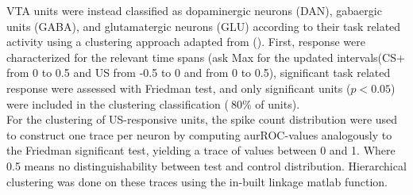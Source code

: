VTA units were instead classified as dopaminergic neurons (DAN), gabaergic units (GABA), and glutamatergic neurons (GLU) according to their task related activity using a clustering approach adapted from (\cite{Uchida}). First, response were characterized for the relevant time spans ({\color{red}ask Max for the updated intervals}(CS+ from 0 to 0.5 and US from -0.5 to 0 and from 0 to 0.5), significant task related response were assessed with Friedman test, and only significant units ($p<0.05$) were included in the clustering classification ($~80\%$ of units).\\For the clustering of US-responsive units, the spike count distribution were used to construct one trace per neuron by computing aurROC-values analogously to the Friedman significant test, yielding a trace of values between 0 and 1. Where 0.5 means no distinguishability between test and control distribution. Hierarchical clustering was done on these traces using the in-built linkage matlab function.
